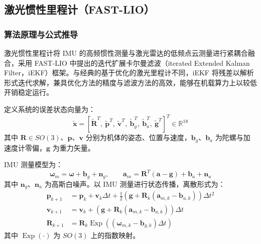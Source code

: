 \subsection{激光惯性里程计（FAST-LIO）}
\subsubsection{算法原理与公式推导}
激光惯性里程计将 IMU 的高频惯性测量与激光雷达的低频点云测量进行紧耦合融合，采用 FAST-LIO 中提出的迭代扩展卡尔曼滤波（iterated Extended Kalman Filter，iEKF）框架。与经典的基于优化的激光里程计不同，iEKF 将残差以解析形式迭代求解，兼具优化方法的精度与滤波方法的高效，能够在机载算力上以较低开销稳定运行。

定义系统的误差状态向量为：
\begin{equation}
    \tilde{\boldsymbol{x}} = 
    \left[ \tilde{\boldsymbol{R}}^T,\ \tilde{\boldsymbol{p}}^T,\ \tilde{\boldsymbol{v}}^T,\ 
    \tilde{\boldsymbol{b}}_g^T,\ \tilde{\boldsymbol{b}}_a^T,\ \tilde{\boldsymbol{g}}^T \right]^T
    \in \mathbb{R}^{18}
\end{equation}
其中 $\boldsymbol{R}\in SO(3)$、$\boldsymbol{p}$、$\boldsymbol{v}$ 分别为机体的姿态、位置与速度，$\boldsymbol{b}_g$、$\boldsymbol{b}_a$ 为陀螺与加速度计零偏，$\boldsymbol{g}$ 为重力矢量。

IMU 测量模型为：
\begin{equation}
    \boldsymbol{\omega}_m = \boldsymbol{\omega} + \boldsymbol{b}_g + \boldsymbol{n}_g,\qquad
    \boldsymbol{a}_m = \boldsymbol{R}^T(\boldsymbol{a} - \boldsymbol{g}) + \boldsymbol{b}_a + \boldsymbol{n}_a
\end{equation}
其中 $\boldsymbol{n}_g$、$\boldsymbol{n}_a$ 为高斯白噪声。以 IMU 测量进行状态传播，离散形式为：
\begin{equation}
\begin{aligned}
    \boldsymbol{p}_{k+1} &= \boldsymbol{p}_k + \boldsymbol{v}_k\Delta t
        + \tfrac{1}{2}\left( \boldsymbol{g} + \boldsymbol{R}_k(\boldsymbol{a}_{m,k} - \boldsymbol{b}_{a,k}) \right)\Delta t^2 \\
    \boldsymbol{v}_{k+1} &= \boldsymbol{v}_k 
        + \left( \boldsymbol{g} + \boldsymbol{R}_k(\boldsymbol{a}_{m,k} - \boldsymbol{b}_{a,k}) \right)\Delta t \\
    \boldsymbol{R}_{k+1} &= \boldsymbol{R}_k \operatorname{Exp}\left( (\boldsymbol{\omega}_{m,k} - \boldsymbol{b}_{g,k}) \Delta t \right)
\end{aligned}
\end{equation}
其中 $\operatorname{Exp}(\cdot)$ 为 $SO(3)$ 上的指数映射。


